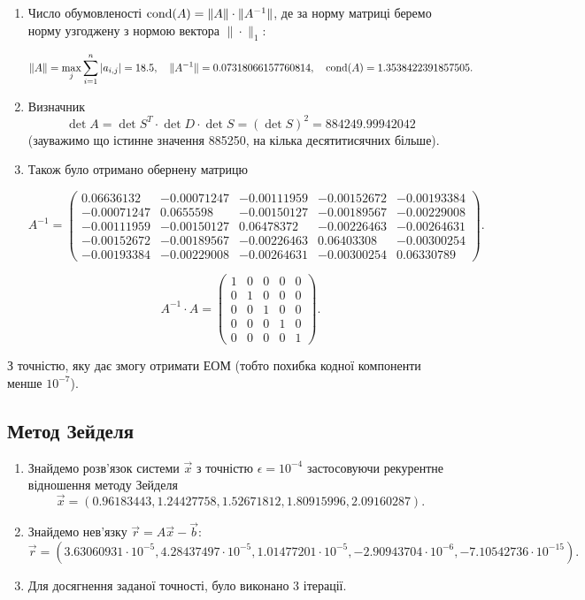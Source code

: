 \begin{enumerate}
\item Число обумовленості $\operatorname{cond}(A)=\|A\|\cdot\|A^{-1}\|$, де за норму матриці беремо норму  узгоджену з нормою вектора $\|\cdot\|_1$:

\[ \|A\| = \displaystyle\max\limits_j \displaystyle\sum\limits_{i=1}^n |a_{i,j}| = 18.5, \quad \|A^{-1}\| = 0.07318066157760814, \quad \operatorname{cond}(A) = 1.3538422391857505. \]

\item Визначник \[ \det A = \det S^T \cdot \det D \cdot \det S = (\det S)^2 = 884249.99942042 \] (зауважимо що істинне значення 885250, на кілька десятитисячних більше). \\

\item Також було отримано обернену матрицю

\[ A^{-1} = \begin{pmatrix} 0.06636132 & -0.00071247 & -0.00111959 & -0.00152672 & -0.00193384 \\ -0.00071247 & 0.0655598 & -0.00150127 & -0.00189567 & -0.00229008 \\ -0.00111959 & -0.00150127 & 0.06478372 & -0.00226463 & -0.00264631 \\ -0.00152672 & -0.00189567 & -0.00226463 & 0.06403308 & -0.00300254 \\ -0.00193384 & -0.00229008 & -0.00264631 & -0.00300254 & 0.06330789 \end{pmatrix}. \]

\[ A^{-1} \cdot A = \begin{pmatrix} 1 & 0 & 0 & 0 & 0 \\ 0 & 1 & 0 & 0 & 0 \\ 0 & 0 & 1 & 0 & 0 \\ 0 & 0 & 0 & 1 & 0 \\ 0 & 0 & 0 & 0 & 1 \end{pmatrix}. \]
\end{enumerate}

З точністю, яку дає змогу отримати ЕОМ (тобто похибка кодної компоненти менше $10^{-7}$).  \\

\subsection{Метод Зейделя}

\begin{enumerate}
\item Знайдемо розв'язок системи $\vec x$ з точністю $\epsilon = 10^{-4}$ застосовуючи рекурентне відношення методу Зейделя \[ \vec x = (0.96183443, 1.24427758, 1.52671812, 1.80915996, 2.09160287). \]

\item Знайдемо нев'язку $\vec r = A \vec x - \vec b$: \[ \vec r = (3.63060931 \cdot 10^{-5}, 4.28437497\cdot 10^{-5}, 1.01477201\cdot10^{-5}, -2.90943704\cdot10^{-6}, -7.10542736\cdot10^{-15}). \]

\item Для досягнення заданої точності, було виконано 3 ітерації.
\end{enumerate}

